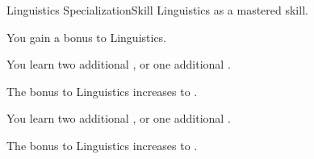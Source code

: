     \begin{feat}{Linguistics Specialization}{Skill}
        \featpre Linguistics as a mastered skill.
        \featben

         You gain a  bonus to Linguistics.

         You learn two additional , or one additional .

         The bonus to Linguistics increases to .

         You learn two additional , or one additional .

         The bonus to Linguistics increases to .
    \end{feat}

